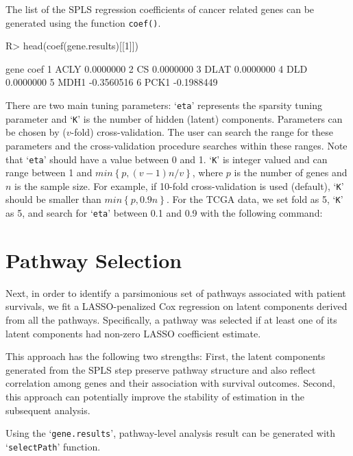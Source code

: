 \documentclass[11pt]{article}
\begin{document}
The list of the SPLS regression coefficients of cancer related genes can be generated using the function \texttt{coef()}.

\begin{Schunk}
\begin{Sinput}
R> head(coef(gene.results)[[1]])
\end{Sinput}
\begin{Soutput}
  gene       coef
1 ACLY  0.0000000
2   CS  0.0000000
3 DLAT  0.0000000
4  DLD  0.0000000
5 MDH1 -0.3560516
6 PCK1 -0.1988449
\end{Soutput}
\end{Schunk}

There are two main tuning parameters: `\texttt{eta}' represents
the sparsity tuning parameter and `\texttt{K}'
is the number of hidden (latent) components. Parameters can be chosen by ($v$-fold)
cross-validation. The user can search the range for these parameters and
the cross-validation procedure
searches within these ranges. Note that `\texttt{eta}' should have a value between 0 and 1. `\texttt{K}'
is integer valued and can range between
1 and $ min \left\{ p, (v-1) n / v \right\} $, where $p$ is the number of genes and $n$ is the sample size. For example, if 10-fold cross-validation is used (default), `\texttt{K}' should be smaller than $ min \left\{ p, 0.9 n \right\} $. For the TCGA data, we set fold as 5, `\texttt{K}' as 5, and search for `\texttt{eta}' between 0.1 and 0.9 with the following command:


\section{Pathway Selection}

Next, in order to identify a parsimonious set of pathways associated with patient survivals, we fit a LASSO-penalized Cox regression \cite{LASSO} on latent components derived from all the pathways.
Specifically, a pathway was selected if at least one of its latent components had non-zero LASSO coefficient estimate.

This approach has the following two strengths:
First, the latent components generated from the SPLS step preserve pathway structure and also reflect correlation among genes and their association with survival outcomes. Second, this approach can potentially improve the stability of estimation in the subsequent analysis.

Using the `\texttt{gene.results}', pathway-level analysis result can be generated with `\texttt{selectPath}' function.
\end{document}
